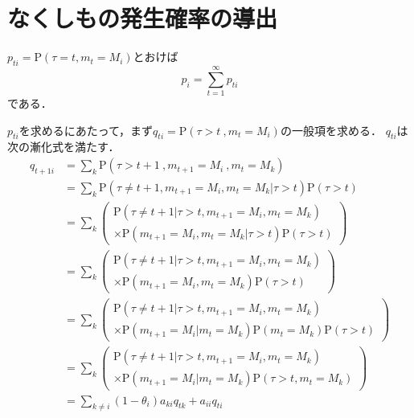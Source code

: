 \chapter{なくしもの発生確率の導出}

$ p_{t i} = \mathrm{P}(\tau = t , m_t = M_i) $とおけば
\begin{equation} \label{eq:p_sum_pt}
    p_i = \sum_{t=1}^{\infty}p_{t i}
\end{equation}
である．

$ p_{t i} $を求めるにあたって，まず$ q_{t i} = \mathrm{P}(\tau > t\ ,m_t = M_i) $の一般項を求める．
$ q_{t i} $は次の漸化式を満たす．
\begin{align}
    q_{t+1 i} & = \! \sum_{k} \mathrm{P}(\tau \! > \! t + 1\ , m_{t+1} \! = \! M_i\ , m_t \! = \! M_k) \\
    & = \! \sum_{k} \mathrm{P}(\tau \! \ne \! t + 1 , m_{t+1} \! = \! M_i , m_t \! = \! M_k | \tau \! > \! t) \mathrm{P}(\tau \! > \! t) \\
    & = \! \sum_{k} \left(
        \begin{array}{l}
            \mathrm{P}(\tau \! \ne \! t + 1 | \tau \! > \! t , m_{t+1} \! = \! M_i , m_t \! = \! M_k) \\
            \times \mathrm{P}(m_{t+1} \! = \! M_i , m_t \! = \! M_k | \tau \! > \! t) \mathrm{P}(\tau \! > \! t)
        \end{array}
    \right) \\
    & = \! \sum_{k} \left(
        \begin{array}{l}
            \mathrm{P}(\tau \! \ne \! t + 1 | \tau \! > \! t , m_{t+1} \! = \! M_i , m_t \! = \! M_k) \\
            \times \mathrm{P}(m_{t+1} \! = \! M_i , m_t \! = \! M_k) \mathrm{P}(\tau \! > \! t)
        \end{array}
    \right) \\
    & = \! \sum_{k} \left(
        \begin{array}{l}
            \mathrm{P}(\tau \! \ne \! t + 1 | \tau \! > \! t , m_{t+1} \! = \! M_i , m_t \! = \! M_k) \\
            \times \mathrm{P}(m_{t+1} \! = \! M_i | m_t \! = \! M_k) \mathrm{P}(m_t \! = \! M_k) \mathrm{P}(\tau \! > \! t)
        \end{array}
    \right) \\
    & = \! \sum_{k} \left(
        \begin{array}{l}
            \mathrm{P}(\tau \! \ne \! t + 1 | \tau \! > \! t , m_{t+1} \! = \! M_i , m_t \! = \! M_k) \\
            \times \mathrm{P}(m_{t+1} \! = \! M_i | m_t \! = \! M_k) \mathrm{P}(\tau \! > \! t , m_t \! = \! M_k)
        \end{array}
    \right) \\
    & = \! \sum_{k \ne i} (1 - \theta_i) a_{k i} q_{t k} + a_{i i} q_{t i} \label{eq:qti_rec}
\end{align}

